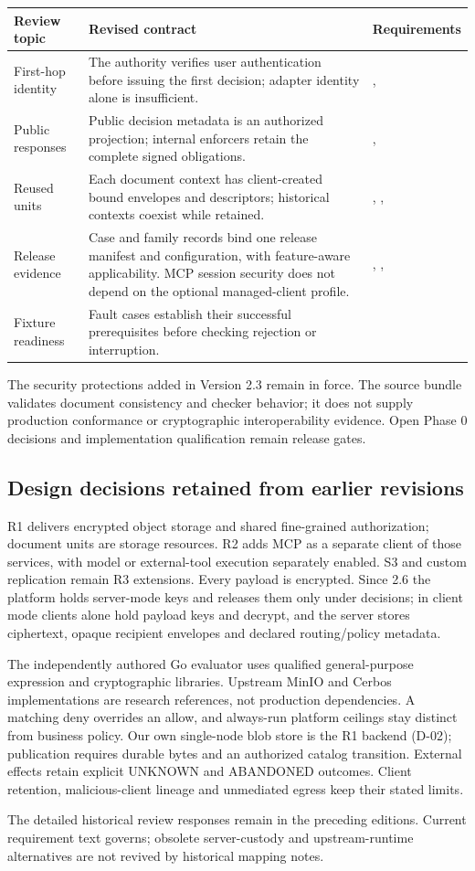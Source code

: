 \begin{longtable}{@{}P{0.23\textwidth}P{0.48\textwidth}P{0.19\textwidth}@{}}
\toprule Review topic & Revised contract & Requirements\\\midrule\endhead
First-hop identity & The authority verifies user authentication before issuing the first decision; adapter identity alone is insufficient. & , \\
Public responses & Public decision metadata is an authorized projection; internal enforcers retain the complete signed obligations. & , \\
Reused units & Each document context has client-created bound envelopes and descriptors; historical contexts coexist while retained. & , , \\
Release evidence & Case and family records bind one release manifest and configuration, with feature-aware applicability. MCP session security does not depend on the optional managed-client profile. & , , \\
Fixture readiness & Fault cases establish their successful prerequisites before checking rejection or interruption. & \\
\bottomrule
\end{longtable}

The security protections added in Version 2.3 remain in force. The source bundle validates document consistency and checker behavior; it does not supply production conformance or cryptographic interoperability evidence. Open Phase 0 decisions and implementation qualification remain release gates.

\subsection{Design decisions retained from earlier revisions}
R1 delivers encrypted object storage and shared fine-grained authorization; document units are storage resources. R2 adds MCP as a separate client of those services, with model or external-tool execution separately enabled. S3 and custom replication remain R3 extensions. Every payload is encrypted. Since 2.6 the platform holds server-mode keys and releases them only under decisions; in client mode clients alone hold payload keys and decrypt, and the server stores ciphertext, opaque recipient envelopes and declared routing/policy metadata.

The independently authored Go evaluator uses qualified general-purpose expression and cryptographic libraries. Upstream MinIO and Cerbos implementations are research references, not production dependencies. A matching deny overrides an allow, and always-run platform ceilings stay distinct from business policy. Our own single-node blob store is the R1 backend (D-02); publication requires durable bytes and an authorized catalog transition. External effects retain explicit UNKNOWN and ABANDONED outcomes. Client retention, malicious-client lineage and unmediated egress keep their stated limits.

The detailed historical review responses remain in the preceding editions. Current requirement text governs; obsolete server-custody and upstream-runtime alternatives are not revived by historical mapping notes.
